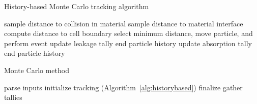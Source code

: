 \begin{algorithm}
\DontPrintSemicolon
\caption{History-based Monte Carlo tracking algorithm}
\label{alg:historybased}
{ 
    {
       sample distance to collision in material\;
       sample distance to material interface\;
       compute distance to cell boundary\;
       select minimum distance, move particle, and perform event\;
       {
          update leakage tally\;
          end particle history\;
       }
       {
          update absorption tally\;
          end particle history\;
       }
    }
}
\end{algorithm}

\begin{algorithm}
\DontPrintSemicolon
\caption{Monte Carlo method}
\label{alg:mcmethod}
parse inputs\;
{
	initialize\;
	tracking (Algorithm~\ref{alg:historybased})\;
	finalize\;
}
gather tallies\;
\end{algorithm}




